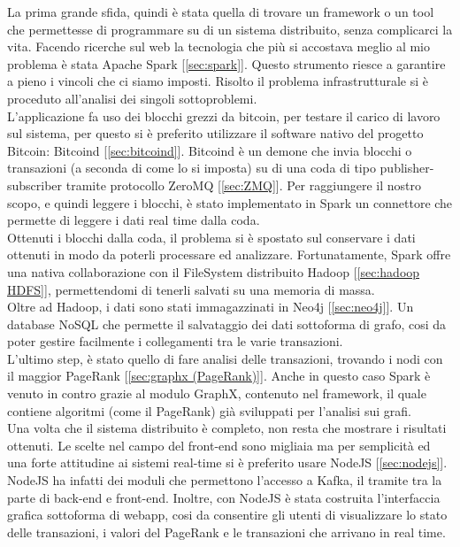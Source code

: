 La prima grande sfida, quindi è stata quella di trovare un framework o un tool che permettesse di programmare su di un sistema distribuito, senza complicarci la vita. Facendo ricerche sul web la tecnologia che più si accostava meglio al mio problema è stata Apache Spark [\ref{sec:spark}]. Questo strumento riesce a garantire a pieno i vincoli che ci siamo imposti. Risolto il problema infrastrutturale si è proceduto all'analisi dei singoli sottoproblemi. 
\\L'applicazione fa uso dei blocchi grezzi da bitcoin, per testare il carico di lavoro sul sistema, per questo si è preferito utilizzare il software nativo del progetto Bitcoin: Bitcoind [\ref{sec:bitcoind}]. Bitcoind è un demone che invia blocchi o transazioni (a seconda di come lo si imposta) su di una coda di tipo publisher-subscriber tramite protocollo ZeroMQ [\ref{sec:ZMQ}]. Per raggiungere il nostro scopo, e quindi leggere i blocchi, è stato implementato in Spark un connettore che permette di leggere i dati real time dalla coda.
\\Ottenuti i blocchi dalla coda, il problema si è spostato sul conservare i dati ottenuti in modo da poterli processare ed analizzare. Fortunatamente, Spark offre una nativa collaborazione con il FileSystem distribuito Hadoop [\ref{sec:hadoop HDFS}], permettendomi di tenerli salvati su una memoria di massa.
\\Oltre ad Hadoop, i dati sono stati immagazzinati in Neo4j [\ref{sec:neo4j}]. Un database NoSQL che permette il salvataggio dei dati sottoforma di grafo, cosi da poter gestire facilmente i collegamenti tra le varie transazioni.
\\L'ultimo step, è stato quello di fare analisi delle transazioni, trovando i nodi con il maggior PageRank [\ref{sec:graphx (PageRank)}]. Anche in questo caso Spark è venuto in contro grazie al modulo GraphX, contenuto nel framework, il quale contiene algoritmi (come il PageRank) già sviluppati per l'analisi sui grafi.  
\\Una volta che il sistema distribuito è completo, non resta che mostrare i risultati ottenuti. Le scelte nel campo del front-end sono migliaia ma per semplicità ed una forte attitudine ai sistemi real-time si è preferito usare NodeJS [\ref{sec:nodejs}]. NodeJS ha infatti dei moduli che permettono l'accesso a Kafka, il tramite tra la parte di back-end e front-end. Inoltre, con NodeJS è stata costruita l'interfaccia grafica sottoforma di webapp, cosi da consentire gli utenti di visualizzare lo stato delle transazioni, i valori del PageRank e le transazioni che arrivano in real time.




